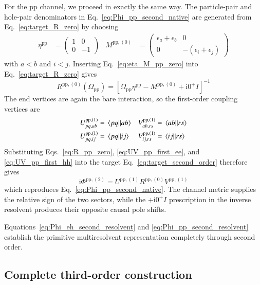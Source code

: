 \documentclass[aip,jcp,reprint,noshowkeys,superscriptaddress]{revtex4-1}
\newcommand{\eps}{\epsilon}
\newcommand{\ii}{\mathrm{i}}
\newcommand{\pp}{\text{pp}}
\begin{document}
For the $\pp$ channel, we proceed in exactly the same way.
The particle-pair and hole-pair denominators in
Eq.~\eqref{eq:Phi_pp_second_native} are generated from
Eq.~\eqref{eq:target_R_zero} by choosing
\begin{align}
	\eta^\pp
	&=
	\begin{pmatrix}
	1&0
	\\
	0&-1
	\end{pmatrix}
	&
	M^{\pp,(0)}
	&=
	\begin{pmatrix}
	\eps_a+\eps_b&0
	\\
	0&-(\eps_i+\eps_j)
	\end{pmatrix}
	\label{eq:eta_M_pp_zero}
\end{align}
with $a<b$ and $i<j$.
Inserting Eq.~\eqref{eq:eta_M_pp_zero} into
Eq.~\eqref{eq:target_R_zero} gives
\begin{equation}
	R^{\pp,(0)}(\Omega_\pp)
	=
	\left[
	\Omega_\pp\eta^\pp-M^{\pp,(0)}+\ii0^+I
	\right]^{-1}
	\label{eq:R_pp_zero}
\end{equation}
The end vertices are again the bare interaction, so the first-order
coupling vertices are
\begin{align}
	U^{\pp,(1)}_{pq,ab}
	&=
	\mel{pq}{}{ab}
	&
	V^{\pp,(1)}_{ab,rs}
	&=
	\mel{ab}{}{rs}
	\label{eq:UV_pp_first_ee}
	\\
	U^{\pp,(1)}_{pq,ij}
	&=
	\mel{pq}{}{ij}
	&
	V^{\pp,(1)}_{ij,rs}
	&=
	\mel{ij}{}{rs}
	\label{eq:UV_pp_first_hh}
\end{align}
Substituting Eqs.~\eqref{eq:R_pp_zero},
\eqref{eq:UV_pp_first_ee}, and \eqref{eq:UV_pp_first_hh} into the target
Eq.~\eqref{eq:target_second_order} therefore gives
\begin{equation}
	\ii\Phi^{\pp,(2)}
	=
	U^{\pp,(1)}R^{\pp,(0)}V^{\pp,(1)}
	\label{eq:Phi_pp_second_resolvent}
\end{equation}
which reproduces Eq.~\eqref{eq:Phi_pp_second_native}.
The channel metric supplies the relative sign of the two sectors,
while the $+\ii0^+I$ prescription in the inverse resolvent
produces their opposite causal pole shifts.

Equations~\eqref{eq:Phi_eh_second_resolvent} and
\eqref{eq:Phi_pp_second_resolvent} establish the primitive multiresolvent
representation completely through second order.




\subsection{Complete third-order construction}
\end{document}
